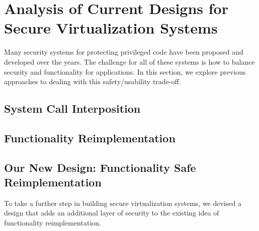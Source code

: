 \section{Analysis of Current Designs for Secure Virtualization Systems}
\label{sec.design}

Many security systems for protecting privileged code have been proposed and
developed over the years. The challenge for all of these systems is how to
balance security and functionality for applications. In this section, we explore previous approaches to
dealing with this safety/usability trade-off.

\subsection{System Call Interposition}


\subsection {Functionality Reimplementation}


\subsection {Our New Design: Functionality Safe Reimplementation}
To take a further step in building secure virtualization systems, 
we devised a design that adds an additional layer of security to 
the existing idea of functionality reimplementation. 

